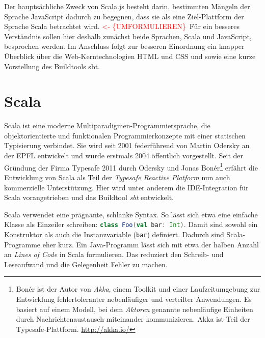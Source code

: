 \documentclass[a4paper, 12pt, hidelinks, listof=totoc, listoftables=totoc, bibliography=totoc]{scrreprt}
\newcommand{\scala}[1]{\lstinline[language=Scala, style=inline]|#1|}
\newcommand{\REDOi}{\textcolor{red}{<- \{UMFORMULIEREN\}~}}
\begin{document}
Der hauptsächliche Zweck von Scala.js besteht darin, bestimmten Mängeln der Sprache JavaScript dadurch zu begegnen, dass sie als eine Ziel-Plattform der Sprache Scala betrachtet wird. \REDOi Für ein besseres Verständnis sollen hier deshalb zunächst beide Sprachen, Scala und JavaScript, besprochen werden. Im Anschluss folgt zur besseren Einordnung ein knapper Überblick über die Web-Kerntechnologien HTML und CSS und sowie eine kurze Vorstellung des Buildtools sbt.

\section{Scala}



Scala ist eine moderne Multiparadigmen-Programmiersprache, die objektorientierte und funktionalen Programmierkonzepte mit einer statischen Typisierung verbindet. Sie wird seit 2001 federführend von Martin Odersky an der \ac{EPFL} entwickelt und wurde erstmals 2004 öffentlich vorgestellt.
Seit der Gründung der Firma Typesafe 2011 durch Odersky und Jonas Bonér\footnote{Bonér ist der Autor von \textit{Akka}, einem Toolkit und einer Laufzeitumgebung zur Entwicklung fehlertoleranter nebenläufiger und verteilter Anwendungen. Es basiert auf einem Modell, bei dem \textit{Aktoren} genannte nebenläufige Einheiten durch Nachrichtenaustausch miteinander kommunizieren. Akka ist Teil der Typesafe-Plattform. \url{http://akka.io/}} erfährt die Entwicklung von Scala als Teil der \textit{Typesafe Reactive Platform} nun auch kommerzielle Unterstützung.
Hier wird unter anderem die IDE-Integration für Scala vorangetrieben und das Buildtool \textit{sbt} entwickelt.\cite{scala-lang2011.CSS} 

Scala verwendet eine prägnante, schlanke Syntax. So lässt sich etwa eine einfache Klasse als Einzeiler schreiben: \scala{class Foo(val bar: Int)}. Damit sind sowohl ein Konstruktor als auch die Instanzvariable (\scala{bar}) definiert. Dadurch sind Scala-Programme eher kurz. Ein Java-Programm lässt sich mit etwa der halben Anzahl an \textit{Lines of Code} in Scala formulieren. Das reduziert den Schreib- und Leseaufwand und die Gelegenheit Fehler zu machen.
\end{document}
